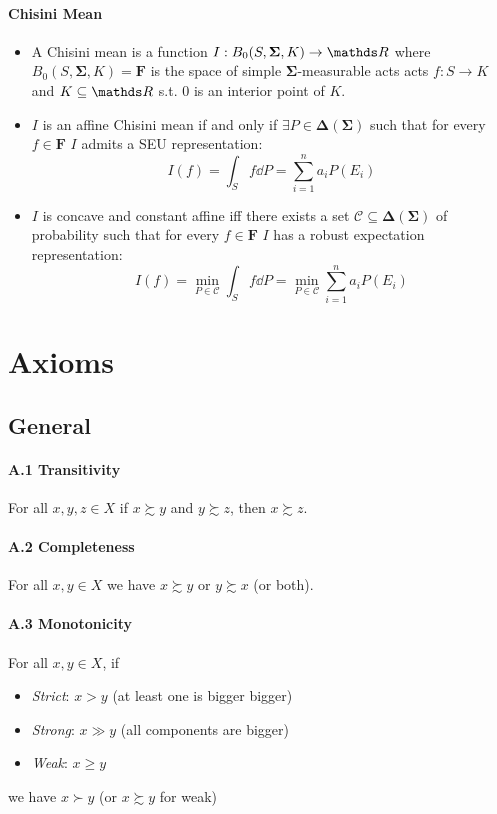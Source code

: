\documentclass[14pt]{extarticle}
\begin{document}
\paragraph{Chisini Mean}
\begin{itemize}
	\item A Chisini mean is a function $I: B_0(S, \bm \Sigma, K) \to \R$
	      where $B_0(S, \bm \Sigma, K) = \bm F$ is the space of simple $\bm \Sigma$-measurable acts
	      acts $f: S\to K$ and $K \subseteq \R$ s.t. $0$ is an interior point of $K$.
	\item $I$ is an affine Chisini mean if and only if $\exists P \in \bm \Delta(\bm \Sigma)$
	      such that for every $f \in \bm F$ $I$ admits a SEU representation:
	      \[
		      I(f) = \int_S f \dd P = \sum_{i = 1}^n a_i P(E_i)
		      \tag{SEU}
	      \]
	\item $I$ is concave and constant affine iff
	      there exists a set $\mathcal C \subseteq \bm \Delta(\bm \Sigma)$
	      of probability such that for every $f \in \bm F$ $I$
	      has a robust expectation representation:
	      \[
		      I(f) = \min_{P \in \mathcal C} \int_S f \dd P
		      = \min_{P \in \mathcal C} \sum_{i=1}^n a_i P(E_i)
		      \tag{Robust}
	      \]
\end{itemize}

%

\section{Axioms}

\subsection{General}

\paragraph{A.1 Transitivity}
For all $x, y, z \in X$ if $x \succsim y$ and $y \succsim z$, then $x \succsim z$.

\paragraph{A.2 Completeness}
For all $x, y \in X$ we have $x \succsim y$ or $y \succsim x$ (or both).

\paragraph{A.3 Monotonicity}
For all $x, y \in X$, if
\begin{itemize}
	\item \textit{Strict}: $x>y$ (at least one is bigger bigger)
	\item \textit{Strong}: $x \gg y$ (all components are bigger)
	\item \textit{Weak}: $x \geq y$
\end{itemize}
we have $x \succ y$ (or $x\succsim y$ for weak)
\end{document}
